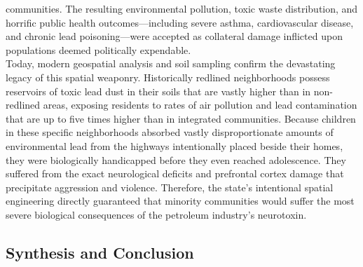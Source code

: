 \documentclass[
]{article}
\begin{document}
communities. The resulting environmental pollution, toxic waste
distribution, and horrific public health outcomes---including severe
asthma, cardiovascular disease, and chronic lead poisoning---were
accepted as collateral damage inflicted upon populations deemed
politically expendable.\\
Today, modern geospatial analysis and soil sampling confirm the
devastating legacy of this spatial weaponry. Historically redlined
neighborhoods possess reservoirs of toxic lead dust in their soils that
are vastly higher than in non-redlined areas, exposing residents to
rates of air pollution and lead contamination that are up to five times
higher than in integrated communities. Because children in these
specific neighborhoods absorbed vastly disproportionate amounts of
environmental lead from the highways intentionally placed beside their
homes, they were biologically handicapped before they even reached
adolescence. They suffered from the exact neurological deficits and
prefrontal cortex damage that precipitate aggression and violence.
Therefore, the state's intentional spatial engineering directly
guaranteed that minority communities would suffer the most severe
biological consequences of the petroleum industry's neurotoxin.

\subsection{\texorpdfstring{\textbf{Synthesis and
Conclusion}}{Synthesis and Conclusion}}\label{synthesis-and-conclusion}
\end{document}
